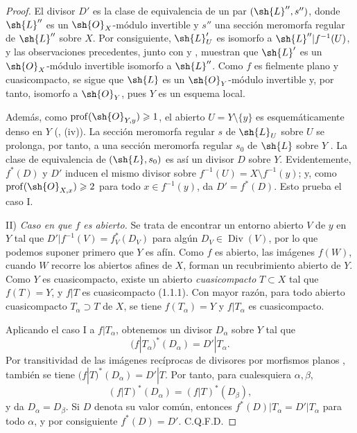 \begin{proof}
El divisor $D'$ es la clase de equivalencia de un par
$(\sh{L}'',s'')$, donde $\sh{L}''$ es un $\sh{O}_X$-módulo invertible
y $s''$ una sección meromorfa regular de $\sh{L}''$ sobre $X$.
Por consiguiente, $\sh{L}'_U$ es isomorfo a
$\sh{L}''|f^{-1}(U)$, y las observaciones precedentes, junto con
{} y {}, muestran que $\sh{L}'$ es un
$\sh{O}_X$-módulo invertible isomorfo a $\sh{L}''$. Como $f$ es
fielmente plano y cuasicompacto, se sigue que $\sh{L}$ es un
$\sh{O}_Y$-módulo invertible {} y, por tanto, isomorfo a $\sh{O}_Y$, pues
$Y$ es un esquema local.

Además, como $\operatorname{prof}(\sh{O}_{Y,y})\geq 1$, el abierto
$U=Y\setminus\{y\}$ es esquemáticamente denso en $Y$
({}, (iv)). La sección meromorfa regular $s$ de $\sh{L}_U$
sobre $U$ se prolonga, por tanto, a una sección meromorfa regular $s_0$ de
$\sh{L}$ sobre $Y$ {}. La clase de equivalencia de
$(\sh{L},s_0)$ es así un divisor $D$ sobre $Y$. Evidentemente, $f^*(D)$ y
$D'$ inducen el mismo divisor sobre
$f^{-1}(U)=X\setminus f^{-1}(y)$; y, como
$\operatorname{prof}(\sh{O}_{X,x})\geq 2$ para todo
$x\in f^{-1}(y)$, {} da $D'=f^*(D)$. Esto prueba el caso I.

\textup{II)} \emph{Caso en que $f$ es abierto.}
Se trata de encontrar un entorno abierto $V$ de $y$ en $Y$ tal
que $D'|f^{-1}(V)=f_V^*(D_V)$ para algún
$D_V\in\operatorname{Div}(V)$, por lo que podemos suponer primero que $Y$ es afín.
Como $f$ es abierto, las imágenes $f(W)$, cuando $W$ recorre los
abiertos afines de $X$, forman un recubrimiento abierto de $Y$. Como $Y$
es cuasicompacto, existe un abierto \emph{cuasicompacto} $T\subset X$
tal que $f(T)=Y$, y $f|T$ es cuasicompacto (1.1.1). Con mayor razón,
para todo abierto cuasicompacto $T_\alpha\supset T$ de $X$,
se tiene
$f(T_\alpha)=Y$ y $f|T_\alpha$ es cuasicompacto.

Aplicando el caso I a $f|T_\alpha$, obtenemos un divisor $D_\alpha$ sobre
$Y$ tal que
\[
 (f|T_\alpha)^*(D_\alpha)=D'|T_\alpha.
\]
Por transitividad de las imágenes recíprocas de divisores por morfismos planos
{}, también se tiene
$(f|T)^*(D_\alpha)=D'|T$. Por tanto, para cualesquiera $\alpha,\beta$,
\[
 (f|T)^*(D_\alpha)=(f|T)^*(D_\beta),
\]
y {} da $D_\alpha=D_\beta$. Si $D$ denota su valor
común, entonces $f^*(D)|T_\alpha=D'|T_\alpha$ para todo $\alpha$, y
por consiguiente $f^*(D)=D'$. C.Q.F.D.
\end{proof}

